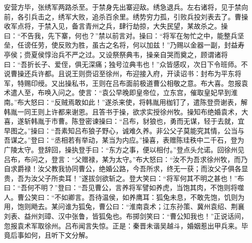 安营方毕，张绣军两路杀至。于禁身先出寨迎敌。绣急退兵。左右诸将，见于禁向前，各引兵击之，绣军大败，追杀百余里。绣势穷力孤，引败兵投刘表去了。曹操收军点将，于禁入见，备言青州之兵，肆行劫掠，大失民望，某故杀之。操曰：“不告我，先下寨，何也？”禁以前言对。操曰：“将军在匆忙之中，能整兵坚垒，任谤任劳，使反败为胜，虽古之名将，何以加兹！”乃赐以金器一副，封益寿亭侯；赍夏侯惇治兵不严之过。又设祭祭典韦，操亲自哭而奠之，顾谓诸将曰：“吾折长子、爱侄，俱无深痛；独号泣典韦也！”众皆感叹，次日下令班师。不说曹操还兵许都。且说王则赍诏至徐州，布迎接入府，开读诏书：封布为平东将军，特赐印绶。又出操私书，王则在吕布面前极道曹公相敬之意。布大喜。忽报袁术遣人至，布唤入问之。使言：“袁公早晚即皇帝位，立东宫，催取皇妃早到淮南。”布大怒曰：“反贼焉敢如此！”遂杀来使，将韩胤用枷钉了，遣陈登赍谢表，解韩胤一同王则上许都来谢恩。且答书于操，欲求实授徐州牧。操知布绝婚袁术，大喜，遂斩韩胤于市曹。陈登密谏操曰：“吕布，豺狼也，勇而无谋，轻于去就，宜早图之。”操曰：“吾素知吕布狼子野心，诚难久养。非公父子莫能究其情，公当与吾谋之。”登曰：“丞相若有举动，某当为内应。”操喜，表赠陈珪秩中二千石，登为广陵太守。登辞回，操执登手曰：“东方之事，便以相付。”登点头允诺。回徐州见吕布，布问之，登言：“父赠禄，某为太守。”布大怒曰：“汝不为吾求徐州牧，而乃自求爵禄！汝父教我协同曹公，绝婚公路，今吾所求，终无一获；而汝父子俱各显贵，吾为汝父子所卖耳！”遂拔剑欲斩之。登大笑曰：“将军何其不明之甚也！”布曰：“吾何不明？”登曰：“吾见曹公，言养将军譬如养虎，当饱其肉，不饱则将噬人。曹公笑曰：“不如卿言。吾待温侯，如养鹰耳：狐兔未息，不敢先饱，饥则为用，饱则飏去。某问谁为狐兔，曹公曰：“淮南袁术；江东孙策、冀州袁绍、荆襄刘表、益州刘璋、汉中张鲁，皆狐兔也。布掷剑笑曰：“曹公知我也！”正说话间，忽报袁术军取徐州。吕布闻言失惊。正是：秦晋未谐吴越斗，婚姻惹出甲兵来。毕竟后事如何，且听下文分解。